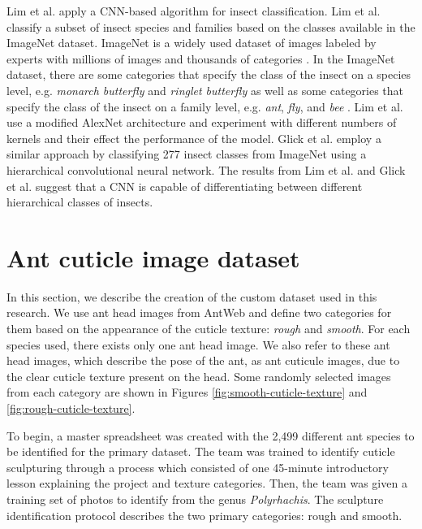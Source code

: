 \documentclass{aci}
\numberwithin{equation}{section}
\begin{document}
Lim et al. \cite{lim_performance_2017} apply a CNN-based algorithm for insect
classification. Lim et al. \cite{lim_performance_2017} classify a subset of
insect species and families based on the classes available in the ImageNet
dataset. ImageNet is a widely used dataset of images labeled by experts with
millions of images and thousands of categories \cite{deng_imagenet_2009}. In the
ImageNet dataset, there are some categories that specify the class of the insect
on a species level, e.g. \textit{monarch butterfly} and \textit{ringlet
    butterfly} as well as some categories that specify the class of the insect on a
family level, e.g. \textit{ant}, \textit{fly}, and \textit{bee}
\cite{deng_imagenet_2009}. Lim et al. \cite{lim_performance_2017} use a modified
AlexNet architecture and experiment with different numbers of kernels and their
effect the performance of the model. Glick et al. \cite{glick_insect_2016}
employ a similar approach by classifying 277 insect classes from ImageNet using
a hierarchical convolutional neural network. The results from Lim et al.
\cite{lim_performance_2017} and Glick et al. \cite{glick_insect_2016} suggest
that a CNN is capable of differentiating between different hierarchical classes
of insects.

\section{Ant cuticle image dataset}


In this section, we describe the creation of the custom dataset used in this
research. We use ant head images from AntWeb \cite{perrichot_antweb_2012} and
define two categories for them based on the appearance of the cuticle texture:
\textit{rough} and \textit{smooth}. For each species used, there exists only one
ant head image. We also refer to these ant head images, which describe the pose
of the ant, as ant cuticule images, due to the clear cuticle texture present on
the head. Some randomly selected images from each category are shown in Figures
\ref{fig:smooth-cuticle-texture} and \ref{fig:rough-cuticle-texture}.

To begin, a master spreadsheet was created with the 2,499 different ant species
to be identified for the primary dataset. The team was trained to identify
cuticle sculpturing through a process which consisted of one 45-minute
introductory lesson explaining the project and texture categories. Then, the
team was given a training set of photos to identify from the genus
\textit{Polyrhachis}. The sculpture identification protocol describes the two
primary categories: rough and smooth.
\end{document}

